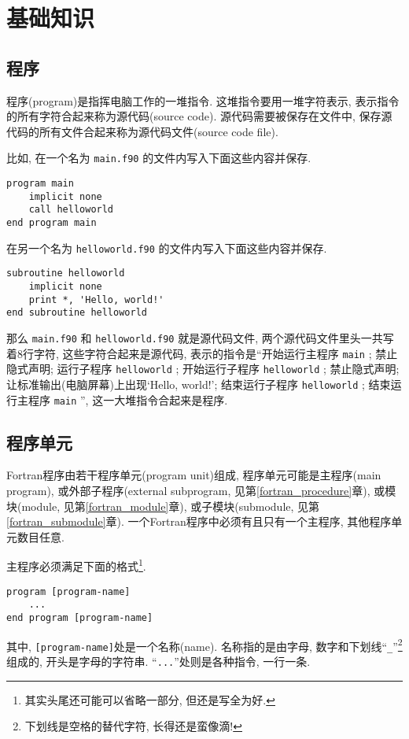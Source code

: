 \chapter{基础知识}

\section{程序}\label{fortran_program}

程序(program)是指挥电脑工作的一堆指令. 这堆指令要用一堆字符表示, 表示指令的所有字符合起来称为源代码(source code). 源代码需要被保存在文件中, 保存源代码的所有文件合起来称为源代码文件(source code file).

比如, 在一个名为 \texttt{main.f90} 的文件内写入下面这些内容并保存.
\begin{lstlisting}
program main
    implicit none
    call helloworld
end program main
\end{lstlisting}
在另一个名为 \texttt{helloworld.f90} 的文件内写入下面这些内容并保存.
\begin{lstlisting}
subroutine helloworld
    implicit none
    print *, 'Hello, world!'
end subroutine helloworld
\end{lstlisting}
那么 \texttt{main.f90} 和 \texttt{helloworld.f90} 就是源代码文件, 两个源代码文件里头一共写着8行字符, 这些字符合起来是源代码, 表示的指令是``开始运行主程序 \texttt{main} ; 禁止隐式声明; 运行子程序 \texttt{helloworld} ; 开始运行子程序 \texttt{helloworld} ; 禁止隐式声明; 让标准输出(电脑屏幕)上出现`Hello, world!'; 结束运行子程序 \texttt{helloworld} ; 结束运行主程序 \texttt{main} '', 这一大堆指令合起来是程序.

\section{程序单元}\label{program_unit}

Fortran程序由若干程序单元(program unit)组成, 程序单元可能是主程序(main program), 或外部子程序(external subprogram, 见第\ref{fortran_procedure}章), 或模块(module, 见第\ref{fortran_module}章), 或子模块(submodule, 见第\ref{fortran_submodule}章). 一个Fortran程序中必须有且只有一个主程序, 其他程序单元数目任意.

主程序必须满足下面的格式\footnote{
    其实头尾还可能可以省略一部分, 但还是写全为好.
}.
\begin{lstlisting}
program [program-name]
    ...
end program [program-name]
\end{lstlisting}
其中, \texttt{[program-name]}处是一个名称(name). 名称指的是由字母, 数字和下划线``\texttt{\_{}}''\footnote{
    下划线是空格的替代字符, 长得还是蛮像滴!
}组成的, 开头是字母的字符串. ``\texttt{...}''处则是各种指令, 一行一条.

